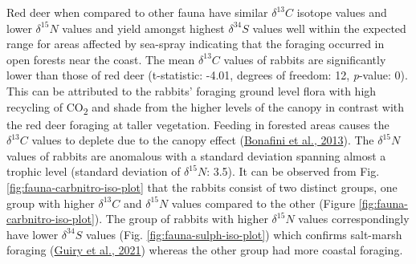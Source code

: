 \documentclass[preprint, 3p, authoryear]{elsarticle} %
\begin{document}
Red deer when compared to other fauna have similar \(\delta ^{13}C\) isotope values and lower \(\delta ^{15}N\) values and yield amongst highest \(\delta ^{34}S\) values well within the expected range for areas affected by sea-spray indicating that the foraging occurred in open forests near the coast. The mean \(\delta ^{13}C\) values of rabbits are significantly lower than those of red deer (t-statistic: -4.01, degrees of freedom: 12, \emph{p}-value: 0). This can be attributed to the rabbits' foraging ground level flora with high recycling of CO\textsubscript{2} and shade from the higher levels of the canopy in contrast with the red deer foraging at taller vegetation. Feeding in forested areas causes the \(\delta ^{13}C\) values to deplete due to the canopy effect (\protect\hyperlink{ref-bonafini_etal13}{Bonafini et al., 2013}). The \(\delta ^{15}N\) values of rabbits are anomalous with a standard deviation spanning almost a trophic level (standard deviation of \(\delta ^{15}N\): 3.5\text{\textperthousand}). It can be observed from Fig. \ref{fig:fauna-carbnitro-iso-plot} that the rabbits consist of two distinct groups, one group with higher \(\delta ^{13}C\) and \(\delta ^{15}N\) values compared to the other (Figure \ref{fig:fauna-carbnitro-iso-plot}). The group of rabbits with higher \(\delta ^{15}N\) values correspondingly have lower \(\delta ^{34}S\) values (Fig. \ref{fig:fauna-sulph-iso-plot}) which confirms salt-marsh foraging (\protect\hyperlink{ref-guiry_etal21a}{Guiry et al., 2021}) whereas the other group had more coastal foraging.
\end{document}
